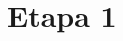 \documentclass[aspectratio=169,10pt]{beamer}
\newcommand{\philab}{\ensuremath{\phi_{\mathrm{lab}}}}
\newcommand{\Vp}{\ensuremath{V_{\mathrm{p}}}}
\newcommand{\Vs}{\ensuremath{V_{\mathrm{s}}}}
\begin{document}

\section{Etapa 1}
\end{document}
